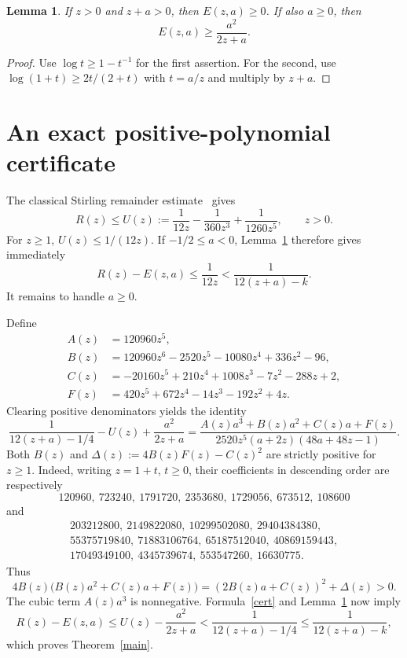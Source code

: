 \documentclass[11pt]{article}
\newtheorem{lemma}[theorem]{Lemma}
\begin{document}
\begin{lemma}\label{entropy}
If $z>0$ and $z+a>0$, then $E(z,a)\ge0$. If also $a\ge0$, then
\[
 E(z,a)\ge\frac{a^2}{2z+a}.
\]
\end{lemma}
\begin{proof}
Use $\log t\ge1-t^{-1}$ for the first assertion. For the second, use
$\log(1+t)\ge2t/(2+t)$ with $t=a/z$ and multiply by $z+a$.
\end{proof}

\newpage
\section{An exact positive-polynomial certificate}
The classical Stirling remainder estimate~\cite[\S5.11(ii)]{DLMF} gives
\begin{equation}\label{U}
 R(z)\le U(z):=\frac1{12z}-\frac1{360z^3}+\frac1{1260z^5},\qquad z>0.
\end{equation}
For $z\ge1$, $U(z)\le1/(12z)$. If $-1/2\le a<0$, Lemma~\ref{entropy}
therefore gives immediately
\[
 R(z)-E(z,a)\le\frac1{12z}<\frac1{12(z+a)-k}.
\]
It remains to handle $a\ge0$.

Define
\begin{align*}
 A(z)&=120960z^5,\\
 B(z)&=120960z^6-2520z^5-10080z^4+336z^2-96,\\
 C(z)&=-20160z^5+210z^4+1008z^3-7z^2-288z+2,\\
 F(z)&=420z^5+672z^4-14z^3-192z^2+4z.
\end{align*}
Clearing positive denominators yields the identity
\begin{equation}\label{cert}
 \frac1{12(z+a)-1/4}-U(z)+\frac{a^2}{2z+a}
 =\frac{A(z)a^3+B(z)a^2+C(z)a+F(z)}
 {2520z^5(a+2z)(48a+48z-1)}.
\end{equation}
Both $B(z)$ and $\Delta(z):=4B(z)F(z)-C(z)^2$ are strictly positive for
$z\ge1$. Indeed, writing $z=1+t$, $t\ge0$, their coefficients in descending
order are respectively
\[
 120960,\ 723240,\ 1791720,\ 2353680,\ 1729056,\ 673512,\ 108600
\]
and
\begin{gather*}
 203212800,\ 2149822080,\ 10299502080,\ 29404384380,\\
 55375719840,\ 71883106764,\ 65187512040,\ 40869159443,\\
 17049349100,\ 4345739674,\ 553547260,\ 16630775.
\end{gather*}
Thus
\[
 4B(z)\bigl(B(z)a^2+C(z)a+F(z)\bigr)
 =(2B(z)a+C(z))^2+\Delta(z)>0.
\]
The cubic term $A(z)a^3$ is nonnegative. Formula~\eqref{cert} and
Lemma~\ref{entropy} now imply
\[
 R(z)-E(z,a)\le U(z)-\frac{a^2}{2z+a}
 <\frac1{12(z+a)-1/4}\le\frac1{12(z+a)-k},
\]
which proves Theorem~\ref{main}.
\end{document}
